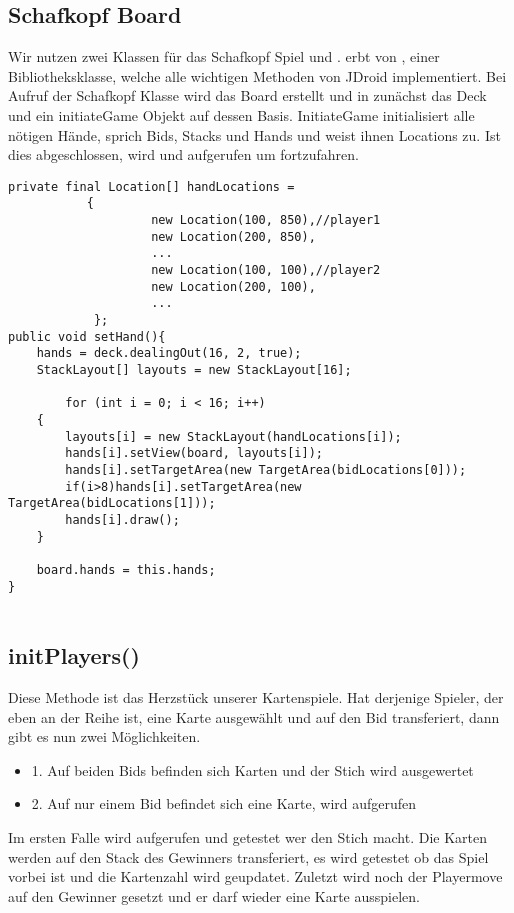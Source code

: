\subsection{Schafkopf Board}
Wir nutzen zwei Klassen für das Schafkopf Spiel  und .
 erbt von , einer Bibliotheksklasse, welche alle wichtigen Methoden von JDroid implementiert. Bei Aufruf der Schafkopf Klasse wird das Board erstellt und in  zunächst das Deck und ein initiateGame Objekt auf dessen Basis. InitiateGame initialisiert alle nötigen Hände, sprich Bids, Stacks und Hands und weist ihnen Locations zu. Ist dies abgeschlossen, wird  und  aufgerufen um fortzufahren.
\begin{lstlisting}[caption={Beispiel Hands initialisieren},captionpos=b]
private final Location[] handLocations =
           {
                    new Location(100, 850),//player1
                    new Location(200, 850),
 					...
                    new Location(100, 100),//player2
                    new Location(200, 100),
       				...
            };
public void setHand(){
    hands = deck.dealingOut(16, 2, true);
    StackLayout[] layouts = new StackLayout[16];

        for (int i = 0; i < 16; i++)
    {
        layouts[i] = new StackLayout(handLocations[i]);
        hands[i].setView(board, layouts[i]);
        hands[i].setTargetArea(new TargetArea(bidLocations[0]));
        if(i>8)hands[i].setTargetArea(new TargetArea(bidLocations[1]));
        hands[i].draw();
    }

    board.hands = this.hands;
}            
           
\end{lstlisting}

\subsection{initPlayers()}
Diese Methode ist das Herzstück unserer Kartenspiele. Hat derjenige Spieler, der eben an der Reihe ist, eine Karte ausgewählt und auf den Bid transferiert, dann gibt es nun zwei Möglichkeiten.
\begin{itemize}
\item 1. Auf beiden Bids befinden sich Karten und der Stich wird ausgewertet
\item 2. Auf nur einem Bid befindet sich eine Karte,  wird 		 aufgerufen
\end{itemize}
Im ersten Falle wird  aufgerufen und getestet wer den Stich macht.
Die Karten werden auf den Stack des Gewinners transferiert, es wird getestet ob das Spiel vorbei ist und die Kartenzahl wird geupdatet. Zuletzt wird noch der Playermove auf den Gewinner gesetzt und er darf wieder eine Karte ausspielen.

